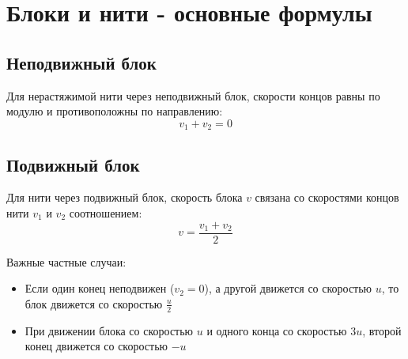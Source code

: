 \documentclass{article}
\begin{document}
\section*{Блоки и нити - основные формулы}

\subsection*{Неподвижный блок}
Для нерастяжимой нити через неподвижный блок, скорости концов равны по модулю и противоположны по направлению:
\[v_1 + v_2 = 0\]

\subsection*{Подвижный блок}
Для нити через подвижный блок, скорость блока $v$ связана со скоростями концов нити $v_1$ и $v_2$ соотношением:
\[v = \frac{v_1 + v_2}{2}\]

Важные частные случаи:
\begin{itemize}
\item Если один конец неподвижен ($v_2=0$), а другой движется со скоростью $u$, то блок движется со скоростью $\frac{u}{2}$
\item При движении блока со скоростью $u$ и одного конца со скоростью $3u$, второй конец движется со скоростью $-u$
\end{itemize}
\end{document}
